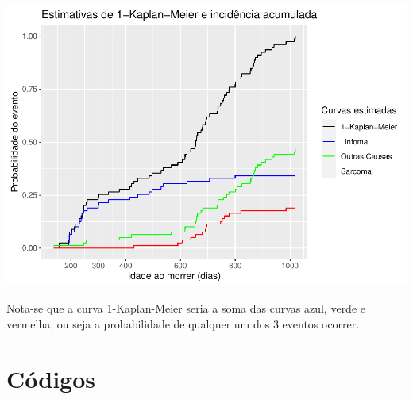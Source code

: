 \documentclass[]{article}
\begin{document}
\begin{center}\includegraphics[width=0.8\linewidth]{Lista_5_files/figure-latex/unnamed-chunk-23-1} \end{center}

Nota-se que a curva 1-Kaplan-Meier seria a soma das curvas azul, verde e
vermelha, ou seja a probabilidade de qualquer um dos 3 eventos ocorrer.

\section{Códigos}\label{codigos}
\end{document}
